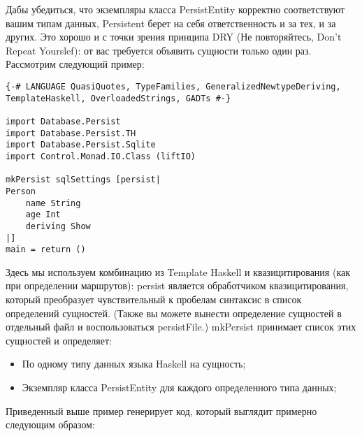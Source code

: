 Дабы убедиться, что экземпляры класса PersistEntity корректно соответствуют вашим типам данных, Persistent берет на себя ответственность и за тех, и за других. Это хорошо и с точки зрения принципа DRY (Не повторяйтесь, Don't Repeat Yourslef): от вас требуется объявить сущности только один раз. Рассмотрим следующий пример:

\begin{lstlisting}
{-# LANGUAGE QuasiQuotes, TypeFamilies, GeneralizedNewtypeDeriving, TemplateHaskell, OverloadedStrings, GADTs #-}

import Database.Persist
import Database.Persist.TH
import Database.Persist.Sqlite
import Control.Monad.IO.Class (liftIO)

mkPersist sqlSettings [persist|
Person
    name String
    age Int
    deriving Show
|]
main = return ()
\end{lstlisting}

Здесь мы используем комбинацию из Template Haskell и квазицитирования (как при определении маршрутов): persist является обработчиком квазицитирования, который преобразует чувствительный к пробелам синтаксис в список определений сущностей. (Также вы можете вынести определение сущностей в отдельный файл и воспользоваться persistFile.) mkPersist принимает список этих сущностей и определяет:

\begin{itemize}
  \item По одному типу данных языка Haskell на сущность;
  \item Экземпляр класса PersistEntity для каждого определенного типа данных;
\end{itemize}

Приведенный выше пример генерирует код, который выглядит примерно следующим образом:

